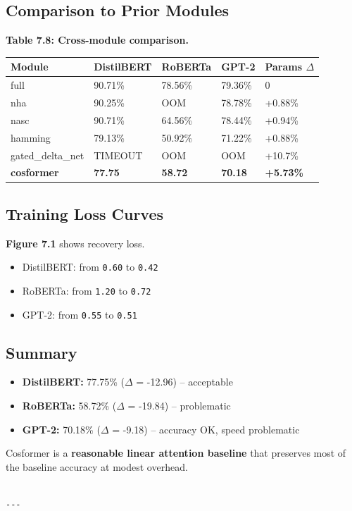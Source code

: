 \subsection{Comparison to Prior Modules}

\textbf{Table 7.8: Cross-module comparison.}

\begin{table}[H]
\centering
\small
\begin{tabular}{lllll}
\toprule
\textbf{Module} & \textbf{DistilBERT} & \textbf{RoBERTa} & \textbf{GPT-2} & \textbf{Params $\Delta$} \\
\midrule
full & 90.71\% & 78.56\% & 79.36\% & 0 \\
nha & 90.25\% & OOM & 78.78\% & +0.88\% \\
nasc & 90.71\% & 64.56\% & 78.44\% & +0.94\% \\
hamming & 79.13\% & 50.92\% & 71.22\% & +0.88\% \\
gated\_delta\_net & TIMEOUT & OOM & OOM & +10.7\% \\
\textbf{cosformer} & \textbf{77.75} & \textbf{58.72} & \textbf{70.18} & \textbf{+5.73\%} \\
\bottomrule
\end{tabular}
\end{table}

\subsection{Training Loss Curves}

\textbf{Figure 7.1} shows recovery loss.

\begin{itemize}
\item DistilBERT: from \texttt{0.60} to \texttt{0.42}
\item RoBERTa: from \texttt{1.20} to \texttt{0.72}
\item GPT-2: from \texttt{0.55} to \texttt{0.51}

\end{itemize}
\subsection{Summary}

\begin{itemize}
\item \textbf{DistilBERT:} 77.75\% ($\Delta$ = -12.96) -- acceptable
\item \textbf{RoBERTa:} 58.72\% ($\Delta$ = -19.84) -- problematic
\item \textbf{GPT-2:} 70.18\% ($\Delta$ = -9.18) -- accuracy OK, speed problematic

\end{itemize}
Cosformer is a \textbf{reasonable linear attention baseline} that preserves 
most of the baseline accuracy at modest overhead.
\begin{lstlisting}

---
\end{lstlisting}

